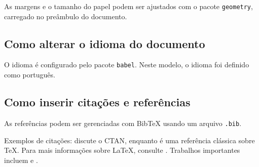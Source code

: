 \documentclass[12pt,oneside,a4paper,english,brazil]{abntex2}
\begin{document}
	As margens e o tamanho do papel podem ser ajustados com o pacote \verb|geometry|, carregado no preâmbulo do documento.
	
	\subsection{Como alterar o idioma do documento}
	
	O idioma é configurado pelo pacote \verb|babel|.  
	Neste modelo, o idioma foi definido como português.
	
	\subsection{Como inserir citações e referências}
	
	As referências podem ser gerenciadas com BibTeX usando um arquivo \verb|.bib|.
	
	Exemplos de citações: \cite{greenwade93} discute o CTAN, enquanto \cite{knuth1984tex} é uma referência clássica sobre \TeX. Para mais informações sobre \LaTeX, consulte \cite{lamport1994latex}. Trabalhos importantes incluem \cite{einstein1905relativity} e \cite{turing1950computing}.
	
	
	
	
\end{document}
